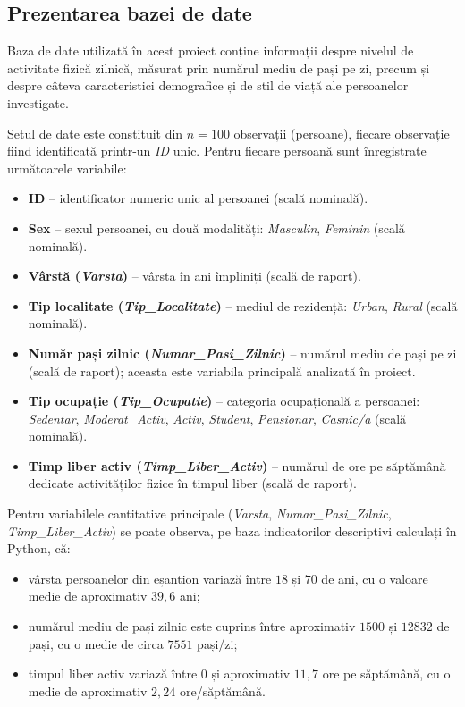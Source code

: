 \documentclass[12pt,a4paper]{report}
\begin{document}
\subsection{Prezentarea bazei de date}

Baza de date utilizată în acest proiect conține informații despre nivelul de activitate fizică zilnică, măsurat prin numărul mediu de pași pe zi, precum și despre câteva caracteristici demografice și de stil de viață ale persoanelor investigate.

Setul de date este constituit din \(n = 100\) observații (persoane), fiecare observație fiind identificată printr-un \textit{ID} unic. Pentru fiecare persoană sunt înregistrate următoarele variabile:

\begin{itemize}
    \item \textbf{ID} -- identificator numeric unic al persoanei (scală nominală).
    \item \textbf{Sex} -- sexul persoanei, cu două modalități: \textit{Masculin}, \textit{Feminin} (scală nominală).
    \item \textbf{Vârstă (\textit{Varsta})} -- vârsta în ani împliniți (scală de raport).
    \item \textbf{Tip localitate (\textit{Tip\_Localitate})} -- mediul de rezidență: \textit{Urban}, \textit{Rural} (scală nominală).
    \item \textbf{Număr pași zilnic (\textit{Numar\_Pasi\_Zilnic})} -- numărul mediu de pași pe zi (scală de raport); aceasta este variabila principală analizată în proiect.
    \item \textbf{Tip ocupație (\textit{Tip\_Ocupatie})} -- categoria ocupațională a persoanei: \textit{Sedentar}, \textit{Moderat\_Activ}, \textit{Activ}, \textit{Student}, \textit{Pensionar}, \textit{Casnic/a} (scală nominală).
    \item \textbf{Timp liber activ (\textit{Timp\_Liber\_Activ})} -- numărul de ore pe săptămână dedicate activităților fizice în timpul liber (scală de raport).
\end{itemize}

Pentru variabilele cantitative principale (\textit{Varsta}, \textit{Numar\_Pasi\_Zilnic}, \textit{Timp\_Liber\_Activ}) se poate observa, pe baza indicatorilor descriptivi calculați în Python, că:

\begin{itemize}
    \item vârsta persoanelor din eșantion variază între \(18\) și \(70\) de ani, cu o valoare medie de aproximativ \(39{,}6\) ani;
    \item numărul mediu de pași zilnic este cuprins între aproximativ \(1500\) și \(12832\) de pași, cu o medie de circa \(7551\) pași/zi;
    \item timpul liber activ variază între \(0\) și aproximativ \(11{,}7\) ore pe săptămână, cu o medie de aproximativ \(2{,}24\) ore/săptămână.
\end{itemize}
\end{document}
